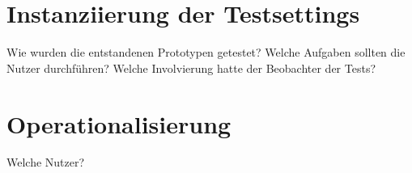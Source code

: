 %

\section{Instanziierung der Testsettings}\label{sec:testsettings} %
Wie wurden die entstandenen Prototypen getestet? Welche Aufgaben sollten die Nutzer durchführen? Welche Involvierung hatte der Beobachter der Tests?

\section{Operationalisierung}\label{sec:operationalisierung}
Welche Nutzer? 